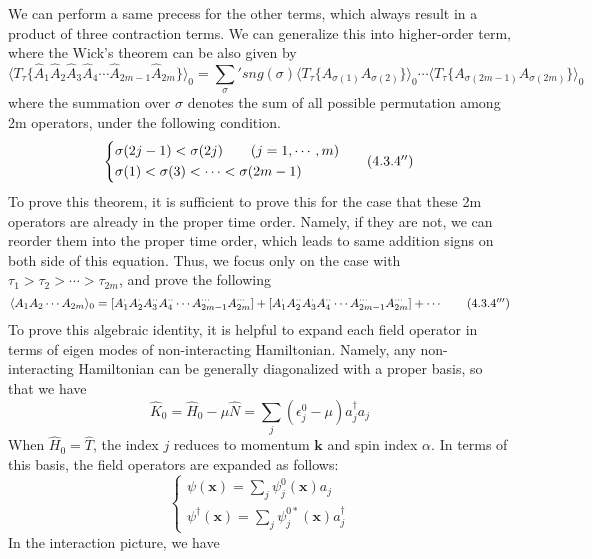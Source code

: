 We can perform a same precess for the other terms, which always result in a product of three contraction terms.
We can generalize this into higher-order term, where the Wick's theorem can be also given by
\[
\langle T_\tau\{ \hat{A}_1\hat{A}_2\hat{A}_3\hat{A}_4 \cdots \hat{A}_{2m-1}\hat{A}_{2m}\}\rangle_0
={\sum_{\sigma}}' sng(\sigma)\langle T_\tau \{A_{\sigma(1)}A_{\sigma(2)}\}\rangle_0 \cdots \langle T_\tau\{A_{\sigma(2m-1)}A_{\sigma(2m)}\}\rangle_0 \tag{$4.3.4^\prime$}
\]
where the summation over $\sigma$ denotes the sum of all possible permutation among 2m operators, under the following condition.
\[
\left\{
\begin{aligned}
&\sigma(2j-1)<\sigma(2j)\qquad(j=1,\cdots,m)\\
&\sigma(1)<\sigma(3)<\cdots<\sigma(2m-1)
\end{aligned}\tag{$4.3.4^{\prime\prime}$}
\right.
\]
To prove this theorem, it is sufficient to prove this for the case that these 2m operators are already in the proper time order.
Namely, if they are not, we can reorder them into the proper time order, which leads to same addition signs on both side of this equation.
Thus, we focus only on the case with $\tau_1>\tau_2>\cdots>\tau_{2m}$, and prove the following
\[ \label{4.3.B}
\langle A_1A_2\cdots A_{2m}\rangle_0=[A_1^{\cdot} A_2^{\cdot} A_3^{\cdot\cdot} A_4^{\cdot\cdot} \cdots A_{2m-1}^{\cdots}A_{2m}^{\cdots}]
+[A_1^{\cdot} A_2^{\cdot\cdot} A_3^{\cdot} A_4^{\cdot\cdot} \cdots A_{2m-1}^{\cdots}A_{2m}^{\cdots}]+\cdots \tag{$4.3.4^{\prime\prime\prime}$}
\]
To prove this algebraic identity, it is helpful to expand each field operator in terms of eigen modes of non-interacting Hamiltonian.
Namely, any non-interacting Hamiltonian can be generally diagonalized with a proper basis, so that we have
\begin{equation}
\hat{K}_0=\hat{H}_0-\mu\hat{N}=\sum_j (\epsilon_j^0-\mu) a_j^\dagger a_j
\end{equation}
When $\hat{H}_0=\hat{T}$, the index $j$ reduces to momentum $\mathbf{k}$ and spin index $\alpha$.
In terms of this basis, the field operators are expanded as follows:
\begin{equation}
\left\{
\begin{aligned}
\psi(\mathbf{x})=\sum_j \psi_j^0(\mathbf{x})a_j\\
\psi^\dagger(\mathbf{x})=\sum_j \psi_j^{0*}(\mathbf{x})a_j^\dagger
\end{aligned}
\right.
\end{equation}
In the interaction picture, we have
